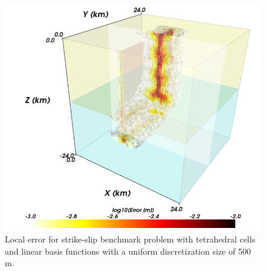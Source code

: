 \noindent \begin{center}
\begin{figure}[H]
\begin{centering}
\includegraphics[scale=0.33]{benchmarks/strikeslip/figs/error_tet4_0500m}
\par\end{centering}

\caption{Local error for strike-slip benchmark problem with tetrahedral cells
and linear basis functions with a uniform discretization size of 500
m.\label{fig:benchmark:strikeslip:tet4:500m}}
\end{figure}

\par\end{center}

